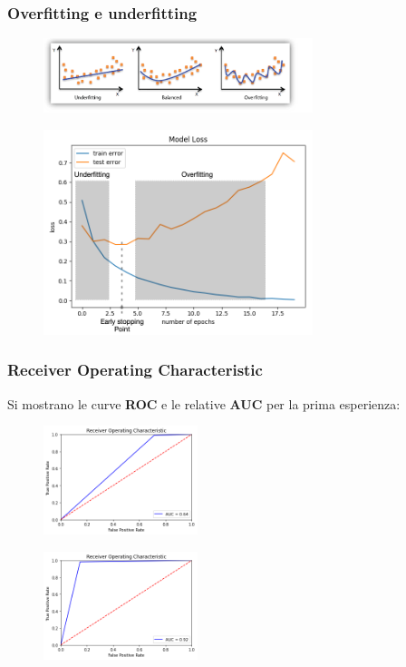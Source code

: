 \documentclass{beamer}
\begin{document}
\begin{frame}
	\frametitle{Overfitting e underfitting}
	
	\begin{figure}
		\includegraphics[width=0.7\textwidth]{ofuf.png}
	\end{figure}

		
	\begin{figure}
		\includegraphics[width=0.7\textwidth]{ofufkeras.png}
	\end{figure}

\end{frame}






\begin{frame}
	\frametitle{Receiver Operating Characteristic}
	Si mostrano le curve \textbf{ROC} e le relative \textbf{AUC} per la prima esperienza:
	\begin{figure}
		\includegraphics[width=0.4\textwidth]{roc-pneumonia-no-aug.png}
	\end{figure}

\begin{figure}
	\includegraphics[width=0.4\textwidth]{roc-pneumonia-aug.png}
\end{figure}	
\end{frame}
\end{document}

